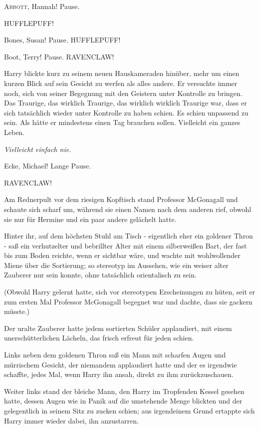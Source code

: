 
\lettrine{\glqq A}{bbott}, Hannah!\grqq{} Pause.

\glqq HUFFLEPUFF!\grqq{}

\glqq Bones, Susan!\grqq{} Pause. \glqq HUFFLEPUFF!\grqq{}

\glqq Boot, Terry!\grqq{} Pause. \glqq RAVENCLAW!\grqq{}

Harry blickte kurz zu seinem neuen Hauskameraden hinüber, mehr um einen kurzen
Blick auf sein Gesicht zu werfen als alles andere. Er versuchte immer noch, sich
von seiner Begegnung mit den Geistern unter Kontrolle zu bringen. Das Traurige,
das wirklich Traurige, das wirklich wirklich Traurige war, dass er sich
tatsächlich wieder unter Kontrolle zu haben schien. Es schien unpassend zu sein.
Als hätte er mindestens einen Tag brauchen sollen. Vielleicht ein ganzes Leben.

\emph{ Vielleicht einfach nie.}

\glqq Ecke, Michael!\grqq{} Lange Pause.

\glqq RAVENCLAW!\grqq{}

Am Rednerpult vor dem riesigen Kopftisch stand Professor McGonagall und schaute
sich scharf um, während sie einen Namen nach dem anderen rief, obwohl sie nur
für Hermine und ein paar andere gelächelt hatte.

Hinter ihr, auf dem höchsten Stuhl am Tisch - eigentlich eher ein goldener Thron
- saß ein verhutzelter und bebrillter Alter mit einem silberweißen Bart, der
fast bis zum Boden reichte, wenn er sichtbar wäre, und wachte mit wohlwollender
Miene über die Sortierung; so stereotyp im Aussehen, wie ein weiser alter
Zauberer nur sein konnte, ohne tatsächlich orientalisch zu sein.

(Obwohl Harry gelernt hatte, sich vor stereotypen Erscheinungen zu hüten, seit
er zum ersten Mal Professor McGonagall begegnet war und dachte, dass sie gackern
müsste.)

Der uralte Zauberer hatte jedem sortierten Schüler applaudiert, mit einem
unerschütterlichen Lächeln, das frisch erfreut für jeden schien.

Links neben dem goldenen Thron saß ein Mann mit scharfen Augen und mürrischem
Gesicht, der niemandem applaudiert hatte und der es irgendwie schaffte, jedes
Mal, wenn Harry ihn ansah, direkt zu ihm zurückzuschauen.

Weiter links stand der bleiche Mann, den Harry im Tropfenden Kessel gesehen
hatte, dessen Augen wie in Panik auf die umstehende Menge blickten und der
gelegentlich in seinem Sitz zu zucken schien; aus irgendeinem Grund ertappte
sich Harry immer wieder dabei, ihn anzustarren.

